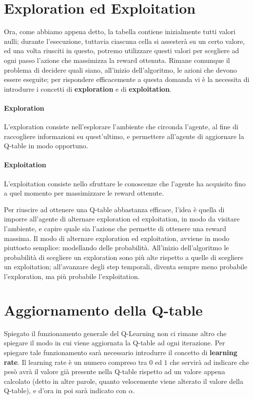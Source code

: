 \documentclass[a4paper,11pt,twoside]{report} %
\begin{document}
\section{Exploration ed Exploitation}
Ora, come abbiamo appena detto, la tabella contiene inizialmente tutti valori nulli; durante l'esecuzione, tuttavia ciascuna cella si assesterà su un certo valore, ed una volta riusciti in questo, potremo utilizzare questi valori per scegliere ad ogni passo l'azione che massimizza la reward ottenuta. Rimane comunque il problema di decidere quali siano, all'inizio dell'algoritmo, le azioni che devono essere eseguite; per rispondere efficacemente a questa domanda vi è la necessita di introdurre i concetti di \textbf{exploration} e di \textbf{exploitation}.

\paragraph{Exploration} 
L'exploration consiste nell'esplorare l'ambiente che circonda l'agente, al fine di raccogliere informazioni su quest'ultimo, e permettere all'agente di aggiornare la Q-table in modo opportuno.

\paragraph{Exploitation}
L'exploitation consiste nello sfruttare le conoscenze che l'agente ha acquisito fino a quel momento per massimizzare le reward ottenute.

\vspace{12px}

Per riuscire ad ottenere una Q-table abbastanza efficace, l'idea è quella di imporre all'agente di alternare exploration ed exploitation, in modo da visitare l'ambiente, e capire quale sia l'azione che permette di ottenere una reward massima. Il modo di alternare exploration ed exploitation, avviene in modo piuttosto semplice: modellando delle probabilità. All'inizio dell'algoritmo le probabilità di scegliere un exploration sono più alte rispetto a quelle di scegliere un exploitation; all'avanzare degli step temporali, diventa sempre meno probabile l'exploration, ma più probabile l'exploitation.

\section{Aggiornamento della Q-table}

Spiegato il funzionamento generale del Q-Learning non ci rimane altro che spiegare il modo in cui viene aggiornata la Q-table ad ogni iterazione. Per spiegare tale funzionamento sarà necessario introdurre il concetto di \textbf{learning rate}. Il learning rate è un numero compreso tra $0$ ed $1$ che servirà ad indicare che pesò avrà il valore già presente nella Q-table rispetto ad un valore appena calcolato (detto in altre parole, quanto velocemente viene alterato il valore della Q-table), e d'ora in poi sarà indicato con $\alpha$.
\end{document}
